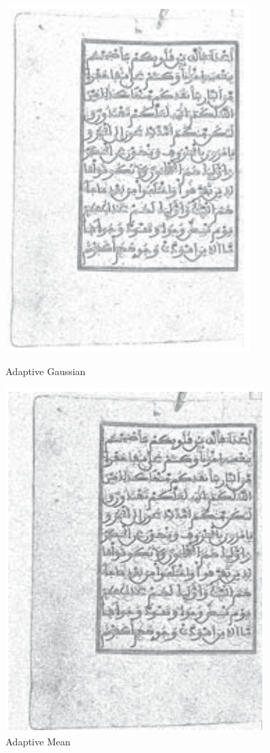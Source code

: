 \begin{itemize}[labelindent=1em,labelsep=0.25cm,leftmargin=*]
        \begin{figure}[!htb]
            \centering
            \begin{minipage}{0.45\linewidth}
                \centering
                \includegraphics[width=0.7\linewidth, height=0.9\linewidth]{images/adaptive-gaussian.png} %
                \caption{Adaptive Gaussian}
                \label{fig:adaptive-gaussian}
            \end{minipage}\hfill
            \begin{minipage}{0.45\linewidth}
                \centering
                \includegraphics[width=0.7\linewidth, height=0.9\linewidth]{images/adaptive-mean.png} %
                \caption{Adaptive Mean}
                \label{fig:adaptive-mean}
            \end{minipage}
        \end{figure}
        

\end{itemize}
